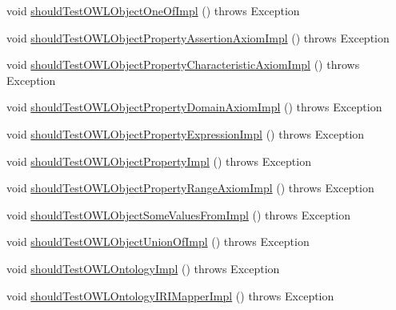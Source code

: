 \begin{DoxyCompactItemize}
\item 
void \hyperlink{classorg_1_1semanticweb_1_1owlapi_1_1contract_1_1_contract_owlapi__3_test_a9bea39dacf40cd32cc487a23105cde77}{should\-Test\-O\-W\-L\-Object\-One\-Of\-Impl} ()  throws Exception 
\item 
void \hyperlink{classorg_1_1semanticweb_1_1owlapi_1_1contract_1_1_contract_owlapi__3_test_aee3f92ca905b8abb33cd59fcf135e959}{should\-Test\-O\-W\-L\-Object\-Property\-Assertion\-Axiom\-Impl} ()  throws Exception 
\item 
void \hyperlink{classorg_1_1semanticweb_1_1owlapi_1_1contract_1_1_contract_owlapi__3_test_a2b74b846c586aa26f7357c82868eef82}{should\-Test\-O\-W\-L\-Object\-Property\-Characteristic\-Axiom\-Impl} ()  throws Exception 
\item 
void \hyperlink{classorg_1_1semanticweb_1_1owlapi_1_1contract_1_1_contract_owlapi__3_test_ad0025b2d7e65d8beca9a2942ac472321}{should\-Test\-O\-W\-L\-Object\-Property\-Domain\-Axiom\-Impl} ()  throws Exception 
\item 
void \hyperlink{classorg_1_1semanticweb_1_1owlapi_1_1contract_1_1_contract_owlapi__3_test_a6cc747d9d2d35928d31049dc945239b5}{should\-Test\-O\-W\-L\-Object\-Property\-Expression\-Impl} ()  throws Exception 
\item 
void \hyperlink{classorg_1_1semanticweb_1_1owlapi_1_1contract_1_1_contract_owlapi__3_test_ac45797449d4f68440d5cda8b6d4bbc45}{should\-Test\-O\-W\-L\-Object\-Property\-Impl} ()  throws Exception 
\item 
void \hyperlink{classorg_1_1semanticweb_1_1owlapi_1_1contract_1_1_contract_owlapi__3_test_ac3d67fd49a5120e0c35158a2cfa83545}{should\-Test\-O\-W\-L\-Object\-Property\-Range\-Axiom\-Impl} ()  throws Exception 
\item 
void \hyperlink{classorg_1_1semanticweb_1_1owlapi_1_1contract_1_1_contract_owlapi__3_test_a59773e9690fa5fedfe0dd0617204b253}{should\-Test\-O\-W\-L\-Object\-Some\-Values\-From\-Impl} ()  throws Exception 
\item 
void \hyperlink{classorg_1_1semanticweb_1_1owlapi_1_1contract_1_1_contract_owlapi__3_test_af1037f70af64e5bad25701ad2c30d2a6}{should\-Test\-O\-W\-L\-Object\-Union\-Of\-Impl} ()  throws Exception 
\item 
void \hyperlink{classorg_1_1semanticweb_1_1owlapi_1_1contract_1_1_contract_owlapi__3_test_aa2878e6d174d40a86570ac71dc243789}{should\-Test\-O\-W\-L\-Ontology\-Impl} ()  throws Exception 
\item 
void \hyperlink{classorg_1_1semanticweb_1_1owlapi_1_1contract_1_1_contract_owlapi__3_test_adccdcb76d66a609496a5a4f0d83bd27f}{should\-Test\-O\-W\-L\-Ontology\-I\-R\-I\-Mapper\-Impl} ()  throws Exception 

\end{DoxyCompactItemize}
